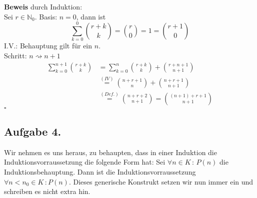 \documentclass[11pt,a4paper,ngerman]{article}
\begin{document}
\textbf{Beweis} durch Induktion: \\
Sei $r \in \mathbb{N}_0$.
Basis: $n = 0$, dann ist
    \begin{equation*}
      \sum_{k=0}^0 \binom{r+k}{k} = \binom{r}{0} = 1 = \binom{r+1}{0}
    \end{equation*}
I.V.: Behauptung gilt für ein $n$. \\
Schritt: $n \rightsquigarrow n+1$
    \begin{equation*}\begin{split}
      \sum_{k=0}^{n+1} \binom{r+k}{k} &= \sum_{k=0}^{n} \binom{r+k}{k} + \binom{r+n+1}{n+1} \\
      &\stackrel{(IV)}{=}\binom{n+r+1}{n} + \binom{n+r+1}{n+1}  \\
      &\stackrel{(Def.)}{=}\binom{n+r+2}{n+1} = \binom{(n+1)+r+1}{n+1}
    \end{split}\end{equation*}
\mbox{} \hfill $\square$
\subsection*{Aufgabe 4.}
Wir nehmen es uns heraus, zu behaupten, dass in einer Induktion die Induktionsvorraussetzung
die folgende Form hat:
Sei $\forall n \in K \, : \, P(n)$ die Induktionsbehauptung. Dann ist die Induktionsvorraussetzung
$\forall n < n_0 \in K \, : P(n)$. Dieses generische Konstrukt setzen wir nun immer ein und schreiben
es nicht extra hin.\\
\end{document}
